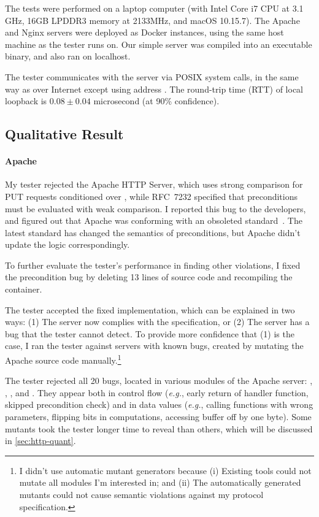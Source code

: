 The tests were performed on a laptop computer (with Intel Core i7 CPU at 3.1
GHz, 16GB LPDDR3 memory at 2133MHz, and macOS 10.15.7).  The Apache and Nginx
servers were deployed as Docker instances, using the same host machine as the
tester runs on.  Our simple server was compiled into an executable binary, and
also ran on localhost.

The tester communicates with the server via POSIX system calls, in the same way
as over Internet except using address .  The round-trip time
(RTT) of local loopback is $0.08\pm0.04$ microsecond (at 90\% confidence).

\subsection{Qualitative Result}
\label{sec:http-qual}
\paragraph{Apache}
My tester rejected the Apache HTTP Server, which uses strong comparison for PUT
requests conditioned over , while RFC~7232 specified that
 preconditions must be evaluated with weak comparison.
  I reported this
bug to the developers, and figured out that Apache was conforming with an
obsoleted \http standard~\cite{rfc2616}.  The latest standard has changed the
semantics of  preconditions, but Apache didn't update the
logic correspondingly.

To further evaluate the tester's performance in finding other violations, I
fixed the precondition bug by deleting 13 lines of source code and recompiling
the container.

The tester accepted the fixed implementation, which can be explained in two
ways: (1) The server now complies with the specification, or (2) The server has
a bug that the tester cannot detect.  To provide more confidence that (1) is the
case, I ran the tester against servers with known bugs, created by mutating the
Apache source code manually.\footnote{I didn't use automatic mutant generators
  because (i) Existing tools could not mutate all modules I'm interested in; and
  (ii) The automatically generated mutants could not cause semantic violations
  against my protocol specification.}

The tester rejected all 20 bugs, located in various modules of the Apache
server: , , , and .
They appear both in control flow ({\it e.g.}, early return of handler function,
skipped precondition check) and in data values ({\it e.g.}, calling functions
with wrong parameters, flipping bits in computations, accessing buffer off by
one byte).  Some mutants took the tester longer time to reveal than others,
which will be discussed in \autoref{sec:http-quant}.

